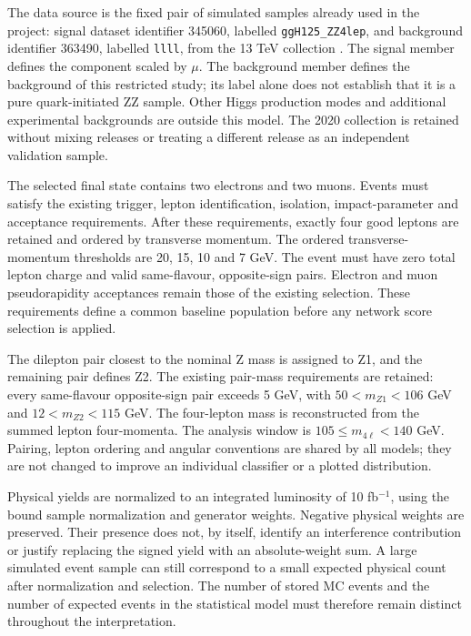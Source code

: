 \documentclass[aps,prd,reprint,superscriptaddress,nofootinbib,longbibliography,floatfix]{revtex4-2}
\begin{document}
The data source is the fixed pair of simulated samples already used in the project: signal
dataset identifier 345060, labelled \nolinkurl{ggH125_ZZ4lep}, and background identifier
363490, labelled \nolinkurl{llll}, from the 13 TeV collection \cite{ATLAS2020}. The signal
member defines the component scaled by \(\mu\). The background member defines the background
of this restricted study; its label alone does not establish that it is a pure
quark-initiated ZZ sample. Other Higgs production modes and additional experimental
backgrounds are outside this model. The 2020 collection is retained without mixing releases
or treating a different release as an independent validation sample.

The selected final state contains two electrons and two muons. Events must satisfy the
existing trigger, lepton identification, isolation, impact-parameter and acceptance
requirements. After these requirements, exactly four good leptons are retained and ordered
by transverse momentum. The ordered transverse-momentum thresholds are 20, 15, 10 and 7 GeV.
The event must have zero total lepton charge and valid same-flavour, opposite-sign pairs.
Electron and muon pseudorapidity acceptances remain those of the existing selection. These
requirements define a common baseline population before any network score selection is
applied.

The dilepton pair closest to the nominal Z mass is assigned to Z1, and the remaining pair
defines Z2. The existing pair-mass requirements are retained: every same-flavour
opposite-sign pair exceeds 5 GeV, with \(50<m_{Z1}<106\) GeV and \(12<m_{Z2}<115\) GeV. The
four-lepton mass is reconstructed from the summed lepton four-momenta. The analysis window
is \(105\leq m_{4\ell}<140\) GeV. Pairing, lepton ordering and angular conventions are
shared by all models; they are not changed to improve an individual classifier or a plotted
distribution.

Physical yields are normalized to an integrated luminosity of 10 fb\(^{-1}\), using the
bound sample normalization and generator weights. Negative physical weights are preserved.
Their presence does not, by itself, identify an interference contribution or justify
replacing the signed yield with an absolute-weight sum. A large simulated event sample can
still correspond to a small expected physical count after normalization and selection. The
number of stored MC events and the number of expected events in the statistical model must
therefore remain distinct throughout the interpretation.
\end{document}
